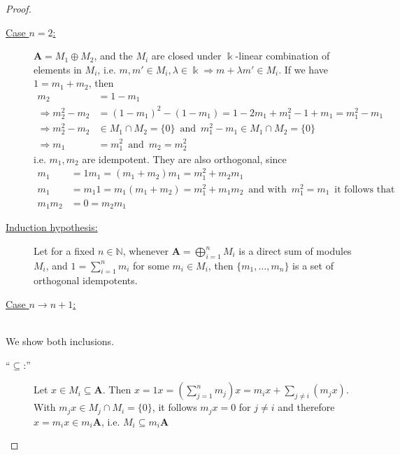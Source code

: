 \begin{proof}[Proof\nopunct]
\begin{subproof}
\begin{description}
\item[\ul{Case $n = 2$:}] $\mathbf{A} = M_{1} \oplus M_{2}$, and the $M_{i}$ are closed under $\Bbbk$-linear combination of
elements in $M_{i}$, i.e. $m,m' \in M_{i}, \lambda \in \Bbbk \Rightarrow m + \lambda m' \in M_{i}$. If we have
$1 = m_{1} + m_{2}$, then 
\begin{align}
m_{2} &= 1 - m_{1} \\
\Rightarrow m_{2}^{2} - m_{2} &= (1-m_{1})^{2} - (1 - m_{1}) = 1 - 2m_{1} + m_{1}^{2} - 1 + m_{1} = m_{1}^{2} - m_{1} \\
\Rightarrow m_{2}^{2} - m_{2} &\in M_{1}\cap M_{2} = \{0\} \,\text{ and }\, m_{1}^{2} - m_{1} \in M_{1}\cap M_{2} = \{0\} \\
\Rightarrow m_{1} &= m_{1}^{2} \,\text{ and }\, m_{2} = m_{2}^{2}
\end{align}
i.e. $m_{1}, m_{2}$ are idempotent. They are also orthogonal, since
\begin{align}
m_{1} &= 1m_{1} = (m_{1}+m_{2})m_{1} = m_{1}^{2} + m_{2}m_{1} \\
m_{1} &= m_{1}1 = m_{1}(m_{1}+m_{2}) = m_{1}^{2} + m_{1}m_{2}\,\text{ and with }\, m_{1}^{2} = m_{1}\,\text{ it follows that }\\
m_{1}m_{2} &= 0 = m_{2}m_{1}
\end{align}
\item[\ul{Induction hypothesis:}] Let for a fixed $n \in \mathbb{N}$, whenever $\mathbf{A} = \bigoplus_{i=1}^{n} M_{i}$ is a direct sum of
modules $M_{i}$, and $1 = \sum_{i=1}^{n} m_{i}$ for some $m_{i} \in M_{i}$, then $\{m_{1},\dots,m_{n}\}$ is a set of orthogonal idempotents.
\item[\ul{Case $n \rightarrow n+1$:}] 
\end{description}
\end{subproof}
\begin{subproof}[Proof that $M_{i} = m_{i}\mathbf{A}$]\phantom{}\\
We show both inclusions.
\begin{description}
\item[``$\subseteq$:''] Let $x \in M_{i} \subseteq \mathbf{A}$. Then $x = 1x = (\sum_{j=1}^{n} m_{j})x = m_{i}x + \sum_{j\neq i} (m_{j}x)$.
With $m_{j}x \in M_{j}\cap M_{i} = \{0\}$, it follows $m_{j}x = 0$ for $j \neq i$  and therefore $x = m_{i}x \in m_{i}\mathbf{A}$, i.e.
$M_{i} \subseteq m_{i}\mathbf{A}$


\end{description}
\end{subproof}
\end{proof}
